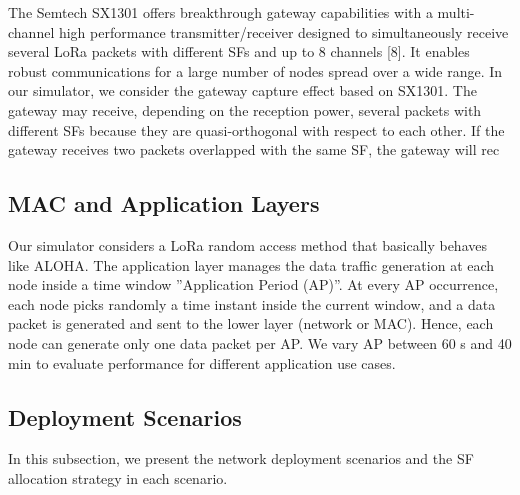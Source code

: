The Semtech SX1301 offers breakthrough gateway capabilities with a multi-channel high performance transmitter/receiver designed to simultaneously receive several LoRa packets with different SFs and up to 8 channels [8].
It enables robust communications for a large number of nodes spread over a wide range.
In our simulator,
	we consider the gateway capture effect based on SX1301.
The gateway may receive,
	depending on the reception power,
	several packets with different SFs because they are quasi-orthogonal with respect to each other.
If the gateway receives two packets overlapped with the same SF,
	the gateway will rec

\subsection{MAC and Application Layers}

Our simulator considers a LoRa random access method that basically behaves like ALOHA.
The application layer manages the data traffic generation at each node inside a time window ”Application Period (AP)”.
At every AP occurrence,
	each node picks randomly a time instant inside the current window,
	and a data packet is generated and sent to the lower layer (network or MAC).
Hence,
	each node can generate only one data packet per AP.
We vary AP between 60 s and 40 min to evaluate performance for different application use cases.

\subsection{Deployment Scenarios}

In this subsection,
	we present the network deployment scenarios and the SF allocation strategy in each scenario.

